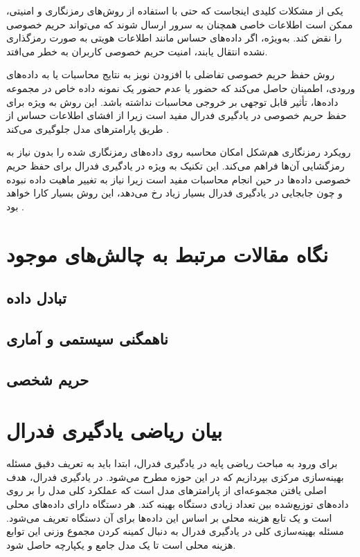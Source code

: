 یکی از مشکلات کلیدی اینجاست که حتی با استفاده از روش‌های رمزنگاری و امنیتی، ممکن است اطلاعات خاصی همچنان به سرور ارسال شوند که می‌تواند حریم خصوصی را نقض کند. به‌ویژه، اگر داده‌های حساس مانند اطلاعات هویتی به صورت رمزگذاری نشده انتقال یابند، امنیت حریم خصوصی کاربران به خطر می‌افتد.


روش حفظ حریم خصوصی تفاضلی%
با افزودن نویز به نتایج محاسبات یا به داده‌های ورودی، اطمینان حاصل می‌کند که حضور یا عدم حضور یک نمونه داده خاص در مجموعه داده‌ها، تأثیر قابل توجهی بر خروجی محاسبات نداشته باشد. این روش به ویژه برای حفظ حریم خصوصی در یادگیری فدرال مفید است زیرا از افشای اطلاعات حساس از طریق پارامترهای مدل جلوگیری می‌کند
\cite{hasan2023security}.

رویکرد رمزنگاری هم‌شکل%
امکان محاسبه روی داده‌های رمزنگاری شده را بدون نیاز به رمزگشایی آن‌ها فراهم می‌کند. این تکنیک به ویژه در یادگیری فدرال برای حفظ حریم خصوصی داده‌ها در حین انجام محاسبات مفید است زیرا نیاز به تغییر ماهیت داده نبوده و چون جابجایی در یادگیری فدرال بسیار زیاد رخ می‌دهد، این روش بسیار کارا خواهد بود
\cite{yin2021comprehensive}.



\section{نگاه مقالات مرتبط به چالش‌های موجود}

\subsection{تبادل داده}

\subsection{ناهمگنی سیستمی و آماری}

\subsection{حریم شخصی}


\section{بیان ریاضی یادگیری فدرال}
برای ورود به مباحث ریاضی پایه در یادگیری فدرال، ابتدا باید به تعریف دقیق مسئله بهینه‌سازی مرکزی بپردازیم که در این حوزه مطرح می‌شود. در یادگیری فدرال، هدف اصلی یافتن مجموعه‌ای از پارامترهای مدل است که عملکرد کلی مدل را بر روی داده‌های توزیع‌شده بین تعداد زیادی دستگاه بهینه کند. هر دستگاه دارای داده‌های محلی است و یک تابع هزینه محلی بر اساس این داده‌ها برای آن دستگاه تعریف می‌شود. مسئله بهینه‌سازی کلی در یادگیری فدرال به دنبال کمینه کردن مجموع وزنی این توابع هزینه محلی است تا یک مدل جامع و یکپارچه حاصل شود.

